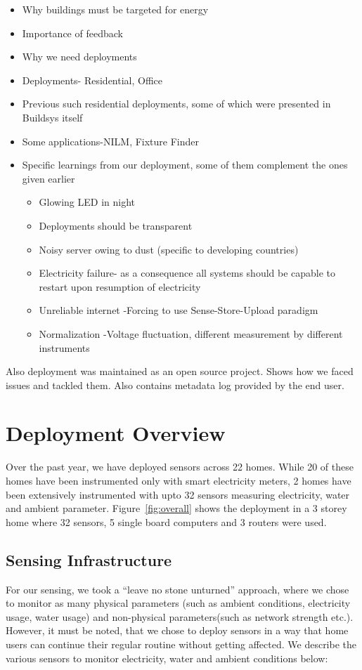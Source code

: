 \documentclass[10pt]{sensys-proc}
\newcommand{\figref}[1]{Figure~\ref{#1}}
\begin{document}
\begin{itemize}
\item Why buildings must be targeted for energy \cite{evans09}
\item Importance of feedback \cite{darby}
\item Why we need deployments
\item Deployments- Residential, Office \cite{yuvraj_ipsn, batra}
\item Previous such residential deployments, some of which were presented in Buildsys itself \cite{hitchhiker_residential,hitchhiker_wsn,scale_wsn}
\item Some applications-NILM\cite{hart,survey1}, Fixture Finder \cite{fixturefinder}
\item Specific learnings from our deployment, some of them complement the ones given earlier \cite{hitchhiker_residential}
\begin{itemize}
\item Glowing LED in night 
\item Deployments should be transparent
\item Noisy server owing to dust (specific to developing countries)
\item Electricity failure- as a consequence all systems should be capable to restart upon resumption of electricity
\item Unreliable internet -Forcing to use Sense-Store-Upload paradigm
\item Normalization -Voltage fluctuation, different measurement by different instruments


\end{itemize}
\end{itemize}
Also deployment was maintained as an open source project. Shows how we faced issues and tackled them. Also contains metadata log provided by the end user.

\section{Deployment Overview}
Over the past year, we have deployed sensors across 22 homes. While 20 of these homes have been instrumented only with smart electricity meters, 2 homes have been extensively instrumented with upto 32 sensors measuring electricity, water and ambient parameter. \figref{fig:overall} shows the deployment in a 3 storey home where 32 sensors, 5 single board computers and 3 routers were used. 
\subsection{Sensing Infrastructure}
For our sensing, we took a ``leave no stone unturned'' approach, where  we chose to monitor as many physical parameters (such as ambient conditions, electricity usage, water usage) and non-physical parameters(such as network strength etc.). However, it must be noted, that we chose to deploy sensors in a way that home users can continue their regular routine without getting affected. We describe the various sensors to monitor electricity, water and ambient conditions below:
\end{document}

